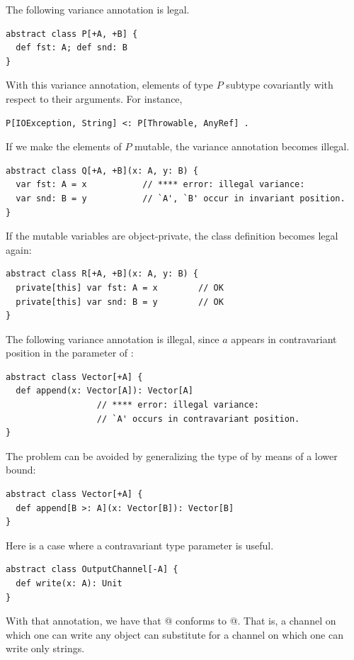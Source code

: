 \example The following variance annotation is legal. 
\begin{lstlisting}
abstract class P[+A, +B] {
  def fst: A; def snd: B
}
\end{lstlisting}
With this variance annotation, elements
of type $P$ subtype covariantly with respect to their arguments. 
For instance, 
\begin{lstlisting}
P[IOException, String] <: P[Throwable, AnyRef] .
\end{lstlisting}

If we make the elements of $P$ mutable, 
the variance annotation becomes illegal. 
\begin{lstlisting}
abstract class Q[+A, +B](x: A, y: B) { 
  var fst: A = x           // **** error: illegal variance:
  var snd: B = y           // `A', `B' occur in invariant position.
}
\end{lstlisting}
If the mutable variables are object-private, the class definition
becomes legal again:
\begin{lstlisting}
abstract class R[+A, +B](x: A, y: B) { 
  private[this] var fst: A = x        // OK
  private[this] var snd: B = y        // OK
}
\end{lstlisting}

\example The following variance annotation is illegal, since $a$ appears
in contravariant position in the parameter of :

\begin{lstlisting}
abstract class Vector[+A] {
  def append(x: Vector[A]): Vector[A]  
                  // **** error: illegal variance: 
                  // `A' occurs in contravariant position.
}
\end{lstlisting} 
The problem can be avoided by generalizing the type of 
by means of a lower bound:

\begin{lstlisting}
abstract class Vector[+A] {
  def append[B >: A](x: Vector[B]): Vector[B] 
}
\end{lstlisting}

\example Here is a case where a contravariant type parameter is useful.

\begin{lstlisting}
abstract class OutputChannel[-A] {
  def write(x: A): Unit
}
\end{lstlisting}
With that annotation, we have that
\lstinline@OutputChannel[AnyRef]@ conforms to \lstinline@OutputChannel[String]@.  
That is, a
channel on which one can write any object can substitute for a channel
on which one can write only strings.

